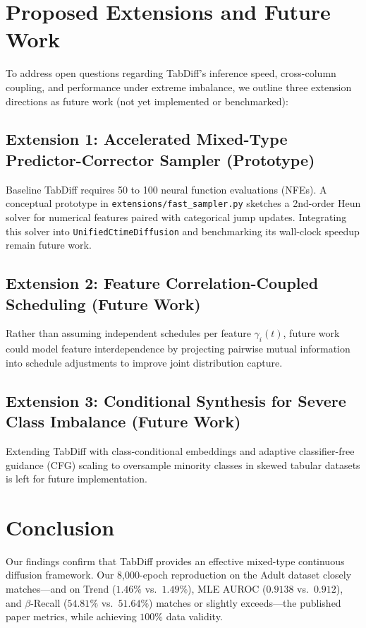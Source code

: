 \documentclass[11pt,a4paper]{article}
\begin{document}
\section{Proposed Extensions and Future Work}
To address open questions regarding TabDiff's inference speed, cross-column coupling, and performance under extreme imbalance, we outline three extension directions as future work (not yet implemented or benchmarked):

\subsection{Extension 1: Accelerated Mixed-Type Predictor-Corrector Sampler (Prototype)}
Baseline TabDiff requires 50 to 100 neural function evaluations (NFEs). A conceptual prototype in \texttt{extensions/fast\_sampler.py} sketches a 2nd-order Heun solver for numerical features paired with categorical jump updates. Integrating this solver into \texttt{UnifiedCtimeDiffusion} and benchmarking its wall-clock speedup remain future work.

\subsection{Extension 2: Feature Correlation-Coupled Scheduling (Future Work)}
Rather than assuming independent schedules per feature $\gamma_i(t)$, future work could model feature interdependence by projecting pairwise mutual information into schedule adjustments to improve joint distribution capture.

\subsection{Extension 3: Conditional Synthesis for Severe Class Imbalance (Future Work)}
Extending TabDiff with class-conditional embeddings and adaptive classifier-free guidance (CFG) scaling to oversample minority classes in skewed tabular datasets is left for future implementation.

\section{Conclusion}
Our findings confirm that TabDiff provides an effective mixed-type continuous diffusion framework. Our 8,000-epoch reproduction on the Adult dataset closely matches—and on Trend ($1.46\%$ vs.\ $1.49\%$), MLE AUROC ($0.9138$ vs.\ $0.912$), and $\beta$-Recall ($54.81\%$ vs.\ $51.64\%$) matches or slightly exceeds—the published paper metrics, while achieving $100\%$ data validity.
\end{document}
